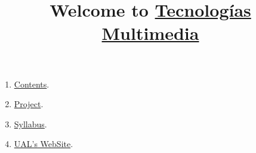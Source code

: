 
%
\title{Welcome to \href{https://github.com/Tecnologiaas-Multimedia}{Tecnologías Multimedia}}

\maketitle

\begin{enumerate}
\item \href{https://tecnologias-multimedia.github.io/contents}{Contents}.
\item \href{https://github.com/Tecnologias-Multimedia/VCF}{Project}.
\item \href{https://tecnologias-multimedia.github.io/syllabus}{Syllabus}.
\item \href{https://www.ual.es/estudios/grados/presentacion/plandeestudios/asignatura/4015/40154321}{UAL's WebSite}.
\end{enumerate}
